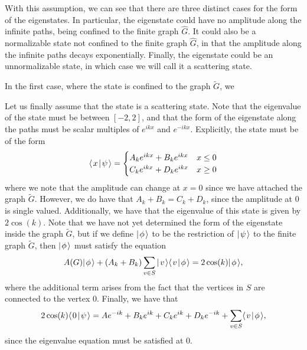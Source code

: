 \documentclass[../thesis-main/thesis-main]{subfiles}
\begin{document}
With this assumption, we can see that there are three distinct cases for the form of the eigenstates.  In particular, the eigenstate could have no amplitude along the infinite paths, being confined to the finite graph $\widehat{G}$.  It could also be a normalizable state not confined to the finite graph $\widehat{G}$, in that the amplitude along the infinite paths decays exponentially.  Finally, the eigenstate could be an unnormalizable state, in which case we will call it a scattering state.

In the first case, where the state is confined to the graph $\widetilde{G}$, we 



Let us finally assume that the state is a scattering state.  Note that the eigenvalue of the state must be between $[-2,2]$, and that the form of the eigenstate along the paths must be scalar multiples of $e^{ikx}$ and $e^{-ikx}$.  Explicitly, the state must be of the form
\begin{align}
  \langle\mspace{2mu} x \mspace{2mu} | \mspace{2mu} \psi\mspace{2mu} \rangle = \begin{cases} A_k e^{i k x} + B_k e^{i k x} & x \leq 0\\
   C_k e^{i k x} + D_k e^{i k x} & x\geq 0\end{cases}
\end{align}
where we note that the amplitude can change at $x=0$ since we have attached the graph $\widetilde{G}$.  However, we do have that $A_k + B_k=C_k +D_k$, since the amplitude at $0$ is single valued.  Additionally, we have that the eigenvalue of this state is given by $2\cos(k)$.  Note that we have not yet determined the form of the eigenstate inside the graph $\widetilde{G}$, but if we define $|\mspace{2mu} \phi \mspace{2mu} \rangle$ to be the restriction of $|\mspace{2mu} \psi \mspace{2mu} \rangle$ to the finite graph $\widetilde{G}$, then $|\mspace{2mu} \phi \mspace{2mu} \rangle$ must satisfy the equation
\begin{equation}
  A(G) |\mspace{2mu} \phi \mspace{2mu} \rangle + (A_k + B_k)\sum_{v\in S} |\mspace{2mu} v \mspace{2mu} \rangle\langle\mspace{2mu} v \mspace{2mu} | \mspace{2mu} \phi\mspace{2mu} \rangle = 2\cos(k) |\mspace{2mu} \phi \mspace{2mu} \rangle,
\end{equation}
where the additional term arises from the fact that the vertices in $S$ are connected to the vertex $0$.  Finally, we have that
\begin{equation}
  2 \cos(k)\langle\mspace{2mu} 0 \mspace{2mu} | \mspace{2mu} \psi\mspace{2mu} \rangle = Ae^{-ik} + B_k e^{ik} + C_k e^{i k} + D_k e^{-ik} + \sum_{v\in S} \langle\mspace{2mu} v \mspace{2mu} | \mspace{2mu} \phi\mspace{2mu} \rangle,
\end{equation}
since the eigenvalue equation must be satisfied at $0$.
\end{document}
